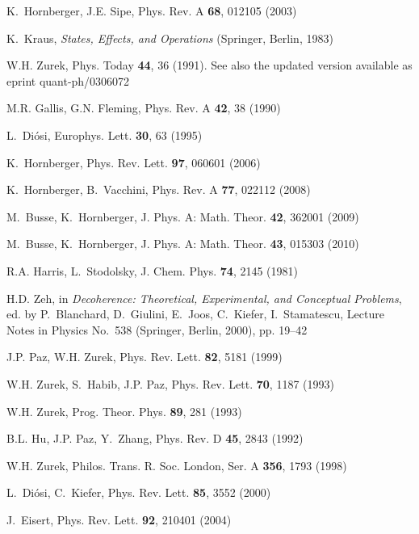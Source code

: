 \documentclass[aps,pra,reprint,amsmath,amssymb,showpacs,nofootinbib,floatfix,onecolumn,12pt]{revtex4-1}
\begin{document}
\begin{thebibliography}{100}
K.~Hornberger, J.E. Sipe, Phys. Rev. A \textbf{68}, 012105 (2003)

K.~Kraus, \emph{States, Effects, and Operations} (Springer, Berlin, 1983)

W.H. Zurek, Phys. Today \textbf{44}, 36 (1991).
\newblock See also the updated version available as eprint quant-ph/0306072

M.R. Gallis, G.N. Fleming, Phys. Rev. A \textbf{42}, 38 (1990)

L.~Di{\'o}si, Europhys. Lett. \textbf{30}, 63 (1995)

K.~Hornberger, Phys. Rev. Lett. \textbf{97}, 060601 (2006)

K.~Hornberger, B.~Vacchini, Phys. Rev. A \textbf{77}, 022112 (2008)

M.~Busse, K.~Hornberger, J. Phys. A: Math. Theor. \textbf{42}, 362001 (2009)

M.~Busse, K.~Hornberger, J. Phys. A: Math. Theor. \textbf{43}, 015303 (2010)

R.A. Harris, L.~Stodolsky, J. Chem. Phys. \textbf{74}, 2145 (1981)

H.D. Zeh, in \emph{Decoherence: {T}heoretical, Experimental, and Conceptual
  Problems}, ed. by P.~Blanchard, D.~Giulini, E.~Joos, C.~Kiefer,
  I.~Stamatescu, Lecture Notes in Physics {No.\ 538} (Springer, Berlin, 2000),
  pp. 19--42

J.P. Paz, W.H. Zurek, Phys. Rev. Lett. \textbf{82}, 5181 (1999)

W.H. Zurek, S.~Habib, J.P. Paz, Phys. Rev. Lett. \textbf{70}, 1187 (1993)

W.H. Zurek, Prog. Theor. Phys. \textbf{89}, 281 (1993)

B.L. Hu, J.P. Paz, Y.~Zhang, Phys. Rev. D \textbf{45}, 2843 (1992)

W.H. Zurek, Philos. Trans. R. Soc. London, Ser. A \textbf{356}, 1793 (1998)

L.~Di{\'o}si, C.~Kiefer, Phys. Rev. Lett. \textbf{85}, 3552 (2000)

J.~Eisert, Phys. Rev. Lett. \textbf{92}, 210401 (2004)


\end{thebibliography}
\end{document}
